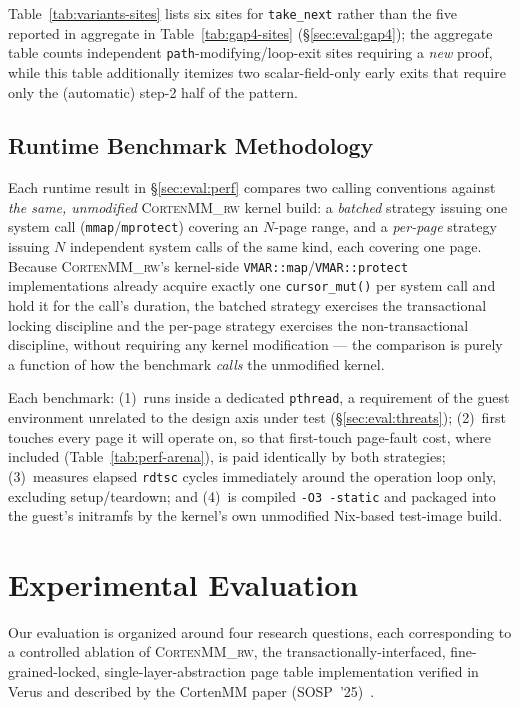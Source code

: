 \documentclass[10pt]{article}
\newcommand{\corten}[1]{\textsc{CortenMM\_#1}}
\newcommand{\vfn}[1]{\texttt{#1}}
\begin{document}
Table~\ref{tab:variants-sites} lists six sites for \vfn{take\_next}
rather than the five reported in aggregate in
Table~\ref{tab:gap4-sites} (\S\ref{sec:eval:gap4}); the aggregate table
counts independent \vfn{path}-modifying/loop-exit sites requiring a
\emph{new} proof, while this table additionally itemizes two
scalar-field-only early exits that require only the (automatic)
step-2 half of the pattern.

\subsection{Runtime Benchmark Methodology}
\label{sec:method:bench}

Each runtime result in \S\ref{sec:eval:perf} compares two calling
conventions against \emph{the same, unmodified} \corten{rw} kernel
build: a \emph{batched} strategy issuing one system call
(\lstinline{mmap}/\lstinline{mprotect}) covering an $N$-page range, and
a \emph{per-page} strategy issuing $N$ independent system calls of the
same kind, each covering one page. Because \corten{rw}'s kernel-side
\vfn{VMAR::map}/\vfn{VMAR::protect} implementations already acquire
exactly one \vfn{cursor\_mut()} per system call and hold it for the
call's duration, the batched strategy exercises the transactional
locking discipline and the per-page strategy exercises the
non-transactional discipline, without requiring any kernel
modification --- the comparison is purely a function of how the
benchmark \emph{calls} the unmodified kernel.

Each benchmark: (1)~runs inside a dedicated \lstinline{pthread}, a
requirement of the guest environment unrelated to the design axis under
test (\S\ref{sec:eval:threats}); (2)~first touches every page it will
operate on, so that first-touch page-fault cost, where included
(Table~\ref{tab:perf-arena}), is paid identically by both strategies;
(3)~measures elapsed \lstinline{rdtsc} cycles immediately around the
operation loop only, excluding setup/teardown; and (4)~is compiled
\lstinline{-O3 -static} and packaged into the guest's initramfs by the
kernel's own unmodified Nix-based test-image build.



\section{Experimental Evaluation}
\label{sec:eval}

Our evaluation is organized around four research questions, each
corresponding to a controlled ablation of \corten{rw}, the
transactionally-interfaced, fine-grained-locked, single-layer-abstraction
page table implementation verified in Verus and described by the
CortenMM paper (SOSP~'25)~\cite{cortenmm}.
\end{document}
